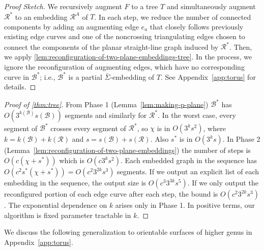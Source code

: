 \documentclass[a4paper,USenglish,cleveref,colorlinks=true,urlcolor=black,linkcolor=black,citecolor=black,thm-restate,authorcolumns]{lipics-v2021}
\theoremstyle{claimstyle}
\begin{document}
\begin{proof}[Proof Sketch]
    We recursively augment $F$ to a tree $T$ and simultaneously augment $\mathcal{R}^*$  to an embedding $\mathcal{R}^A$ of $T$.
    In each step, we reduce the number of connected components by adding an augmenting edge $e_a$ that closely follows previously existing edge curves and one of the noncrossing triangulating edges chosen to connect the components of the planar straight-line graph induced by $\mathcal{R}^*$.
    Then, we apply \cref{lem:reconfiguration-of-two-plane-embeddings-tree}.
    In the process, we ignore the reconfiguration of augmenting edges, which have no corresponding curve in $\mathcal{B}^*$; i.e., $\mathcal{B}^*$ is a partial $\bar\Sigma$-embedding of $T$.
    See Appendix~\ref{app:torus} for details.
\end{proof}



\begin{proof}[Proof of \cref{thm:tree}]
    \label{Pthmforestontorus}
    From Phase 1 (Lemma~\ref{lem:making-p-plane}) $\mathcal B^*$ has $O\left(3^{k({\mathcal B})} s({\mathcal B})\right)$ segments and similarly for $\mathcal R^*$.
    In the worst case, every segment of $\mathcal B^*$ crosses every segment of $\mathcal R^*$, so $\chi$ is in $O(3^k s^2)$, where $k = k({\mathcal B}) + k({\mathcal R})$ and $s = s({\mathcal B}) + s({\mathcal R})$.
    Also $s^*$ is in $O(3^{k} s)$.
    In Phase 2 (Lemma~\ref{lem:reconfiguration-of-two-plane-embeddings}) the number of  steps is $O(c(\chi + s^*))$ which is $ O(c 3^k s^2)$.
    Each embedded graph in the  sequence has $O(c^2 s^*(\chi + s^*)) = O(c^2 3^{2k} s^3)$ segments.
    If we output an explicit list of each embedding in the sequence, the output size is $O(c^3 3^{3k}s^5)$.
    If we only output the reconfigured portion of each edge curve after each step,  the bound is $O(c^2 3^{2k} s^3)$.
    The exponential dependence on $k$ arises only in Phase 1.
    In positive terms, our algorithm is fixed parameter tractable in $k$.
\end{proof}



\noindent We discuss the following generalization to orientable surfaces of higher genus in Appendix~\ref{app:torus}.
\end{document}

